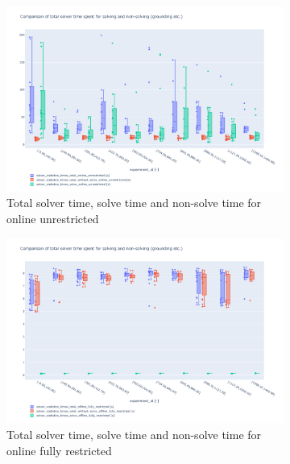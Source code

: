 \documentclass{article}
\begin{document}
\begin{figure}[hbtp]
    \begin{subfigure}{\textwidth}
        \includegraphics[width=\textwidth]{Figures/04_computational_results/solve_non_solve_online_unrestricted.pdf}
        \caption{Total solver time, solve time and non-solve time for online unrestricted}
         \label{fig:computationtimes_solve_non_solve_time_online_unrestricted}
    \end{subfigure}
    \begin{subfigure}{\textwidth}
        \includegraphics[width=\textwidth]{Figures/04_computational_results/solve_non_solve_offline_fully_restricted.pdf}
        \caption{Total solver time, solve time and non-solve time for online fully restricted}
         \label{fig:computationtimes_solve_non_solve_time_online_fully_restricted}
    \end{subfigure}
    \begin{subfigure}{\textwidth}

\end{subfigure}
\end{figure}
\end{document}
